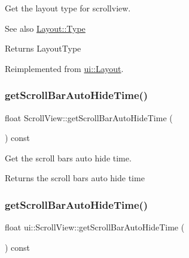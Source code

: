 Get the layout type for scrollview.

\begin{DoxySeeAlso}{See also}
{\ttfamily \hyperlink{classui_1_1Layout_aecabbc1592677eadd6757edc1df5b952}{Layout\+::\+Type}} 
\end{DoxySeeAlso}
\begin{DoxyReturn}{Returns}
Layout\+Type 
\end{DoxyReturn}


Reimplemented from \hyperlink{classui_1_1Layout_a4eaf95d303163cfd1064575625c95b33}{ui\+::\+Layout}.

\mbox{\label{classui_1_1ScrollView_a400f36f7795944486005668c0e350ebd}} 
\subsubsection{\texorpdfstring{get\+Scroll\+Bar\+Auto\+Hide\+Time()}{getScrollBarAutoHideTime()}\hspace{0.1cm}{\footnotesize\ttfamily [1/2]}}
{\footnotesize\ttfamily float Scroll\+View\+::get\+Scroll\+Bar\+Auto\+Hide\+Time (\begin{DoxyParamCaption}{ }\end{DoxyParamCaption}) const}



Get the scroll bar\textquotesingle{}s auto hide time. 

\begin{DoxyReturn}{Returns}
the scroll bar\textquotesingle{}s auto hide time 
\end{DoxyReturn}
\mbox{\label{classui_1_1ScrollView_a827ccba8ebbcacfe3f8b985b49c606e5}} 
\subsubsection{\texorpdfstring{get\+Scroll\+Bar\+Auto\+Hide\+Time()}{getScrollBarAutoHideTime()}\hspace{0.1cm}{\footnotesize\ttfamily [2/2]}}
{\footnotesize\ttfamily float ui\+::\+Scroll\+View\+::get\+Scroll\+Bar\+Auto\+Hide\+Time (\begin{DoxyParamCaption}{ }\end{DoxyParamCaption}) const}



